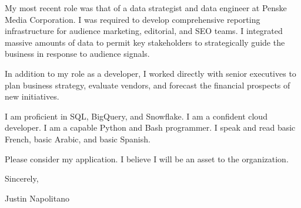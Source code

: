 \documentclass{cover-letter-class}
\begin{document}
{    My most recent role was that of a data strategist and data engineer at Penske Media Corporation. I was required to develop comprehensive reporting infrastructure for audience marketing, editorial, and SEO teams. I integrated massive amounts of data to permit key stakeholders to strategically guide the business in response to audience signals.
    
    \vspace{1em}

    In addition to my role as a developer, I worked directly with senior executives to plan business strategy, evaluate vendors, and forecast the financial prospects of new initiatives.
    
    \vspace{1em}

    I am proficient in SQL, BigQuery, and Snowflake. I am a confident cloud developer. I am a capable Python and Bash programmer. I speak and read basic French, basic Arabic, and basic Spanish.  
    
    \vspace{1em}

    Please consider my application. I believe I will be an asset to the organization.


    
    \vspace{1em}


    \vspace{1em}

    \noindent
    Sincerely,

    \vspace{1em}

    \noindent
    Justin Napolitano
}
\end{document}
